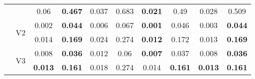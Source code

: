 \documentclass[12pt,a4paper]{article}
\begin{document}
\begin{sidewaystable}[ht]
{\begin{tabular}{cc|cc|cc|cc|cc|}
   &  & 0.06 & \textbf{0.467} & 0.037 & 0.683 & \textbf{0.021} & 0.49 & 0.028 & 0.509 \\ 
   & \multirow{2}{*}{V2} & 0.002 & \textbf{0.044} & 0.006 & 0.067 & \textbf{0.001} & 0.046 & 0.003 & \textbf{0.044} \\ 
   &  & 0.014 & \textbf{0.169} & 0.024 & 0.274 & \textbf{0.012} & 0.172 & 0.013 & \textbf{0.169} \\ 
   & \multirow{2}{*}{V3} & 0.008 & \textbf{0.036} & 0.012 & 0.06 & \textbf{0.007} & 0.037 & 0.008 & \textbf{0.036} \\ 
   &  & \textbf{0.013} & \textbf{0.161} & 0.018 & 0.274 & 0.014 & \textbf{0.161} & \textbf{0.013} & \textbf{0.161} \\ 
   \hline
\end{tabular}
}
\end{sidewaystable}
\end{document}
